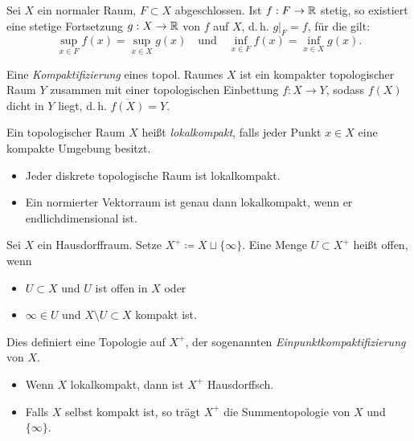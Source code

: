 \documentclass{cheat-sheet}
\begin{document}
\begin{satz}
  Sei $X$ ein normaler Raum, $F \subset X$ abgeschlossen. Ist $f : F \to \mathbb{R}$ stetig, so existiert eine stetige Fortsetzung $g : X \to \mathbb{R}$ von $f$ auf $X$, d.\,h. $g|_F = f$, für die gilt:
  \[
    \sup_{x \in F} f(x) = \sup_{x \in X} g(x)
    \quad \text{und} \quad
    \inf_{x \in F} f(x) = \inf_{x \in X} g(x).
  \]
\end{satz}


\begin{defn}
  Eine \emph{Kompaktifizierung} eines topol. Raumes $X$ ist ein kompakter topologischer Raum $Y$ zusammen mit einer topologischen Einbettung $f : X \to Y$, sodass $f(X)$ dicht in $Y$ liegt, d.\,h. $\overline{f(X)} = Y$.
\end{defn}

\begin{defn}
  Ein topologischer Raum $X$ heißt \emph{lokalkompakt}, falls jeder Punkt $x \in X$ eine kompakte Umgebung besitzt.
\end{defn}

\begin{bspe}
  \begin{itemize}
    \item Jeder diskrete topologische Raum ist lokalkompakt.
    \item Ein normierter Vektorraum ist genau dann lokalkompakt, wenn er endlichdimensional ist.
  \end{itemize}
\end{bspe}

\begin{defn}
  Sei $X$ ein Hausdorffraum. Setze $X^+ \coloneqq X \sqcup \{ \infty \}$. Eine Menge $U \subset X^+$ heißt offen, wenn
  \begin{itemize}
    \item $U \subset X$ und $U$ ist offen in $X$ oder
    \item $\infty \in U$ und $X \setminus U \subset X$ kompakt ist.
  \end{itemize}
  Dies definiert eine Topologie auf $X^+$, der sogenannten \emph{Einpunktkompaktifizierung} von $X$.
\end{defn}

\begin{bem}
  \begin{itemize}
    \item Wenn $X$ lokalkompakt, dann ist $X^+$ Hausdorffsch.
    \item Falls $X$ selbst kompakt ist, so trägt $X^+$ die Summentopologie von $X$ und $\{ \infty \}$.
  \end{itemize}
\end{bem}
\end{document}

